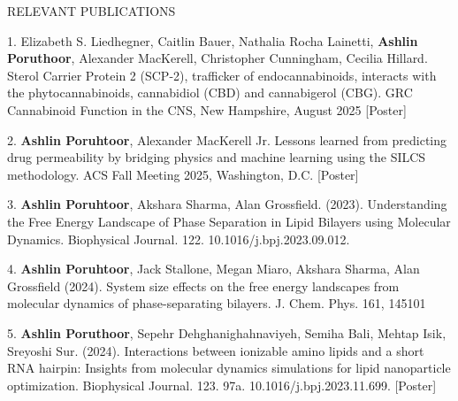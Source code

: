 \documentclass{resume} %
\begin{document}

\begin{rSection}{RELEVANT PUBLICATIONS}

   \item 1. Elizabeth S. Liedhegner, Caitlin Bauer, Nathalia Rocha Lainetti, \textbf{Ashlin Poruthoor}, Alexander MacKerell, Christopher Cunningham, Cecilia Hillard. Sterol Carrier Protein 2 (SCP-2), trafficker of endocannabinoids, interacts with the
phytocannabinoids, cannabidiol (CBD) and cannabigerol (CBG). GRC Cannabinoid Function in the CNS, New Hampshire, August 2025 [Poster]
   \item 2. \textbf{Ashlin Poruhtoor}, Alexander MacKerell Jr. Lessons learned from predicting drug permeability by bridging physics and machine learning using the SILCS methodology. ACS Fall Meeting 2025, Washington, D.C. [Poster]
   \item 3. \textbf{Ashlin Poruhtoor}, Akshara Sharma, Alan Grossfield. (2023). Understanding the Free Energy Landscape of Phase Separation in Lipid Bilayers using Molecular Dynamics. Biophysical Journal. 122. 10.1016/j.bpj.2023.09.012.
   \item 4. \textbf{Ashlin Poruhtoor}, Jack Stallone, Megan Miaro, Akshara Sharma, Alan Grossfield (2024). System size effects on the free energy landscapes from molecular dynamics of phase-separating bilayers. J. Chem. Phys. 161, 145101
   \item 5. \textbf{Ashlin Poruthoor}, Sepehr Dehghanighahnaviyeh, Semiha Bali, Mehtap Isik, Sreyoshi Sur. (2024). Interactions between ionizable amino lipids and a short RNA hairpin: Insights from molecular dynamics simulations for lipid nanoparticle optimization. Biophysical Journal. 123. 97a. 10.1016/j.bpj.2023.11.699. [Poster]

\end{rSection}

\end{document}
